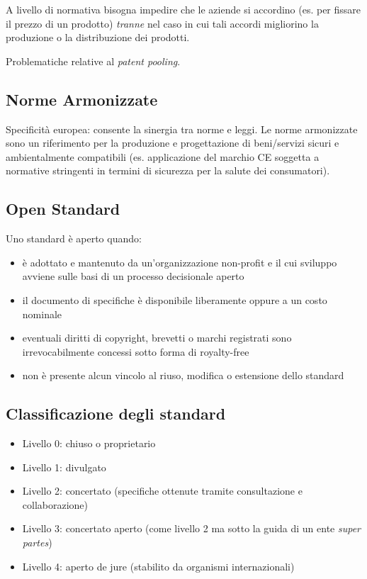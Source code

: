 A livello di normativa bisogna impedire che le aziende si accordino (es. per fissare il prezzo di un prodotto) \textit{tranne} nel caso in cui tali accordi migliorino la produzione o la distribuzione dei prodotti. \bigskip

Problematiche relative al \textit{patent pooling}.

\subsection{Norme Armonizzate}
Specificità europea: consente la sinergia tra norme e leggi. Le norme armonizzate sono un riferimento per la produzione e progettazione di beni/servizi sicuri e ambientalmente compatibili (es. applicazione del marchio CE soggetta a normative stringenti in termini di sicurezza per la salute dei consumatori).

\subsection{Open Standard}
Uno standard è aperto quando:
\begin{itemize}
    \item è adottato e mantenuto da un'organizzazione non-profit e il cui sviluppo avviene sulle basi di un processo decisionale aperto 
    \item il documento di specifiche è disponibile liberamente oppure a un costo nominale
    \item eventuali diritti di copyright, brevetti o marchi registrati sono irrevocabilmente concessi sotto forma di royalty-free
    \item non è presente alcun vincolo al riuso, modifica o estensione dello standard
\end{itemize}

\subsection{Classificazione degli standard}
\begin{itemize}
    \item Livello 0: chiuso o proprietario
    \item Livello 1: divulgato
    \item Livello 2: concertato (specifiche ottenute tramite consultazione e collaborazione)
    \item Livello 3: concertato aperto (come livello 2 ma sotto la guida di un ente \textit{super partes})
    \item Livello 4: aperto de jure (stabilito da organismi internazionali)
\end{itemize}
